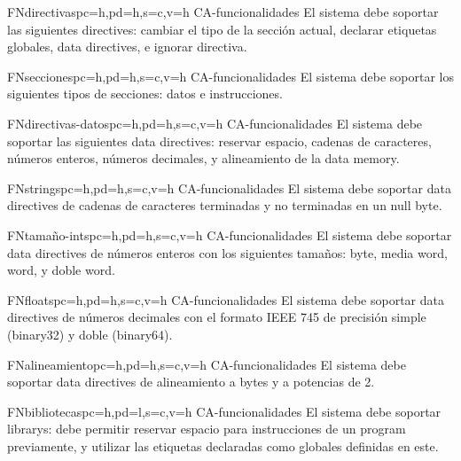 \begin{softwareReq}{FN}{directivas}{pc=h,pd=h,s=c,v=h}
    {CA-funcionalidades}
    El sistema debe soportar las siguientes \glspl{directive}: cambiar el tipo
    de la sección actual, declarar etiquetas globales, \glspl{data directive}, e
    ignorar directiva.
\end{softwareReq}

\begin{softwareReq}{FN}{secciones}{pc=h,pd=h,s=c,v=h}
    {CA-funcionalidades}
    El sistema debe soportar los siguientes tipos de secciones: datos e
    instrucciones.
\end{softwareReq}

\begin{softwareReq}{FN}{directivas-datos}{pc=h,pd=h,s=c,v=h}
    {CA-funcionalidades}
    El sistema debe soportar las siguientes \glspl{data directive}: reservar
    espacio, cadenas de caracteres, números enteros, números decimales, y
    alineamiento de la \gls{data memory}.
\end{softwareReq}

\begin{softwareReq}{FN}{strings}{pc=h,pd=h,s=c,v=h}
    {CA-funcionalidades}
    El sistema debe soportar \glspl{data directive} de cadenas de
    caracteres terminadas y no terminadas en un \gls{null byte}.
\end{softwareReq}

\begin{softwareReq}{FN}{tamaño-ints}{pc=h,pd=h,s=c,v=h}
    {CA-funcionalidades}
    El sistema debe soportar \glspl{data directive} de números enteros con los
    siguientes tamaños: byte, media \gls{word}, \gls{word}, y doble \gls{word}.
\end{softwareReq}

\begin{softwareReq}{FN}{floats}{pc=h,pd=h,s=c,v=h}
    {CA-funcionalidades}
    El sistema debe soportar \glspl{data directive} de números decimales con el
    formato IEEE 745 \parencite{FloatsIEEE} de precisión simple (binary32) y
    doble (binary64).
\end{softwareReq}

\begin{softwareReq}{FN}{alineamiento}{pc=h,pd=h,s=c,v=h}
    {CA-funcionalidades}
    El sistema debe soportar \glspl{data directive} de alineamiento a bytes y a
    potencias de 2.
\end{softwareReq}

\begin{softwareReq}{FN}{bibliotecas}{pc=h,pd=l,s=c,v=h}
    {CA-funcionalidades}
    El sistema debe soportar \glspl{library}: debe permitir reservar espacio para
    instrucciones de un \gls{program} 
    previamente, y utilizar las etiquetas declaradas como globales definidas en
    este.
\end{softwareReq}

